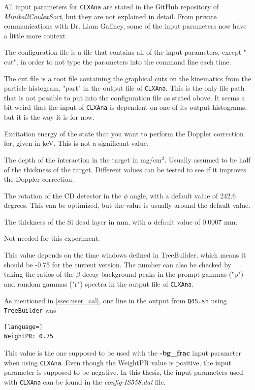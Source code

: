 \documentclass[twoside,english]{uiofysmaster/uiofysmaster}
\let\orgautoref\autoref
\renewcommand{\autoref}
        {%
		 \def\sectionautorefname{Section}%
		 \def\subsectionautorefname{Section}%
		 \def\subsubsectionautorefname{Section}%
		 \def\chapterautorefname{Chapter}%
          \orgautoref}
\begin{document}
All input parameters for \texttt{CLXAna} are stated in the GitHub repository of \textsl{MiniballCoulexSort}, but they are not explained in detail. 
From private communications with Dr. Liam Gaffney, some of the input parameters now have a little more context
\begin{description}[align=left]
	\item [-c] The configuration file is a file that contains all of the input parameters, except "-cut", in order to not type the parameters into the command line each time.
	\item [-cut] The cut file  is a root file containing the graphical cuts on the kinematics from the particle histogram, "part" in the output file of \texttt{CLXAna}. 
	This is the only file path that is not possible to put into the configuration file as stated above. 
	\newline It seems a bit weird that the input of \texttt{CLXAna} is dependent on one of its output histograms, but it is the way it is for now. 
	\item [-Ex] Excitation energy of the state that you want to perform the Doppler correction for, given in keV. This is not a significant value.
	\item [-depth] The depth of the interaction in the target in mg/cm$^2$. 
	Usually assumed to be half of the thickness of the target. 
	Different values can be tested to see if it improves the Doppler correction.
	\item [-cdoffset] The rotation of the CD detector in the $\phi$ angle, with a default value of 242.6 degrees. 
	This can be optimized, but the value is usually around the default value.
	\item [-deadlayer] The thickness of the Si dead layer in mm, with a default value of 0.0007 mm.
	\item [-spededist] Not needed for this experiment.
	\item [-bg\_frac] This value depends on the time windows defined in TreeBuilder, which means it should be -0.75 for the current version. 
	The number can also be checked by taking the ratios of the $\beta$-decay background peaks in the prompt gammas ("p") and random gammas ("r") spectra in the output file of \texttt{CLXAna}.
\end{description}
As mentioned in \autoref{ssec:user_cal}, one line in the output from \texttt{Q4S.sh} using \texttt{TreeBuilder} was
\begin{lstlisting}[language=]
WeightPR: 0.75
\end{lstlisting}
This value is the one supposed to be used with the \textbf{-bg\_frac} input parameter when using \texttt{CLXAna}.
Even though the WeightPR value is positive, the input parameter is supposed to be negative.  
In this thesis, the input parameters used with \texttt{CLXAna} can be found in the \textit{config-IS558.dat} file.
\end{document}
